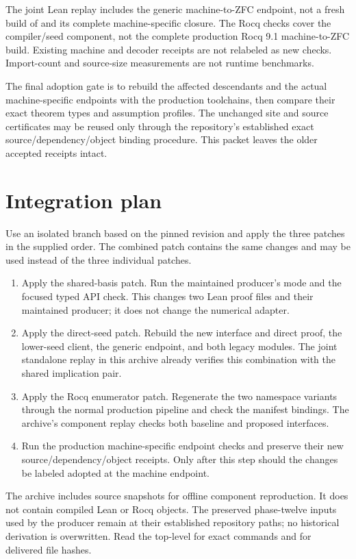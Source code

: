 \documentclass[11pt,letterpaper]{article}
\newcommand{\code}[1]{\texttt{\detokenize{#1}}}
\begin{document}
The joint Lean replay includes the generic machine-to-ZFC endpoint, not a fresh
build of \code{KEndpoint215} and its complete machine-specific closure. The Rocq
checks cover the compiler/seed component, not the complete production Rocq 9.1
machine-to-ZFC build. Existing machine and decoder receipts are not relabeled as
new checks. Import-count and source-size measurements are not runtime benchmarks.

The final adoption gate is to rebuild the affected descendants and the actual
machine-specific endpoints with the production toolchains, then compare their
exact theorem types and assumption profiles. The unchanged site and source
certificates may be reused only through the repository's established exact
source/dependency/object binding procedure. This packet leaves the older
accepted receipts intact.

\section{Integration plan}

Use an isolated branch based on the pinned revision and apply the three patches
in the supplied order. The combined patch contains the same changes and may be
used instead of the three individual patches.

\begin{enumerate}
\item Apply the shared-basis patch. Run the maintained producer's \code{--check}
mode and the focused typed API check. This changes two Lean proof files and
their maintained producer; it does not change the numerical adapter.
\item Apply the direct-seed patch. Rebuild the new interface and direct proof,
the lower-seed client, the generic endpoint, and both legacy modules. The joint
standalone replay in this archive already verifies this combination with the
shared implication pair.
\item Apply the Rocq enumerator patch. Regenerate the two namespace variants
through the normal production pipeline and check the manifest bindings. The
archive's component replay checks both baseline and proposed interfaces.
\item Run the production machine-specific endpoint checks and preserve their
new source/dependency/object receipts. Only after this step should the changes
be labeled adopted at the machine endpoint.
\end{enumerate}

The archive includes source snapshots for offline component reproduction. It
does not contain compiled Lean or Rocq objects. The preserved phase-twelve inputs
used by the producer remain at their established repository paths; no historical
derivation is overwritten. Read the top-level \code{README.md} for exact commands
and \code{MANIFEST.sha256} for delivered file hashes.
\end{document}
